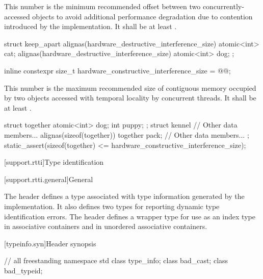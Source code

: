 \pnum
This number is the minimum recommended offset
between two concurrently-accessed objects
to avoid additional performance degradation due to contention
introduced by the implementation.
It shall be at least .

%
\begin{example}
\begin{codeblock}
struct keep_apart {
  alignas(hardware_destructive_interference_size) atomic<int> cat;
  alignas(hardware_destructive_interference_size) atomic<int> dog;
};
\end{codeblock}
\end{example}

%
\begin{itemdecl}
inline constexpr size_t hardware_constructive_interference_size = @\impdef{}@;
\end{itemdecl}

\pnum
This number is the maximum recommended size of contiguous memory
occupied by two objects accessed with temporal locality by concurrent threads.
It shall be at least .

%
\begin{example}
\begin{codeblock}
struct together {
  atomic<int> dog;
  int puppy;
};
struct kennel {
  // Other data members...
  alignas(sizeof(together)) together pack;
  // Other data members...
};
static_assert(sizeof(together) <= hardware_constructive_interference_size);
\end{codeblock}
\end{example}

[support.rtti]{Type identification}

[support.rtti.general]{General}

\pnum
The header  defines a
type associated with type information generated by the implementation.
It also defines two types for reporting dynamic type identification errors.
The header  defines
a wrapper type for use as an index type in associative containers
and in unordered associative containers.

[typeinfo.syn]{Header  synopsis}

%
%
%
%
\begin{codeblock}
// all freestanding
namespace std {
  class type_info;
  class bad_cast;
  class bad_typeid;
}
\end{codeblock}


